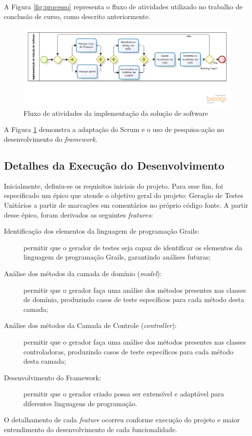 \par 
\indent A Figura \ref{fig:processo} representa o fluxo de atividades utilizado no trabalho de conclusão de curso, como descrito anteriormente.  
  
    \begin{figure}[h]
    \centering
    \includegraphics[width=\textwidth]{figuras/ProcessoInterno.png}
    \caption{Fluxo de atividades da implementação da solução de software}
    \label{fig:processointerno}
  \end{figure}

\par 
\indent A Figura \ref{fig:processointerno} demonstra a adaptação do Scrum e o uso de pesquisa-ação no desenvolvimento do \textit{framework}. 
 
\subsection{Detalhes da Execução do Desenvolvimento}
	Inicialmente, definiu-se os requisitos iniciais do projeto. Para esse fim, foi especificado um épico que atende o objetivo geral do projeto: \textsf{Geração de Testes Unitários a partir de marcações em comentários no próprio código fonte}. A partir desse épico, foram derivados as seguintes \textit{features}:
	\begin{description}
	\item[Identificação dos elementos da linguagem de programação Grails:] permitir que o gerador de testes seja capaz de identificar os elementos da linguagem de programação Grails, garantindo análises futuras;
	\item[Análise dos métodos da camada de domínio (\textit{model}):] permitir que o gerador faça uma análise dos métodos presentes nas classes de domínio, produzindo casos de teste específicos para cada método desta camada;
	\item[Análise dos métodos da Camada de Controle (\textit{controller}):] permitir que o gerador faça uma análise dos métodos presentes nas classes controladoras, produzindo casos de teste específicos para cada método desta camada;
	\item[Desenvolvimento do Framework:] permitir que o gerador criado possa ser extensível e adaptável para diferentes linguagens de programação.
	\end{description}
\par
\indent O detalhamento de cada \textit{feature} ocorreu conforme execução do projeto e maior entendimento do desenvolvimento de cada funcionalidade.

